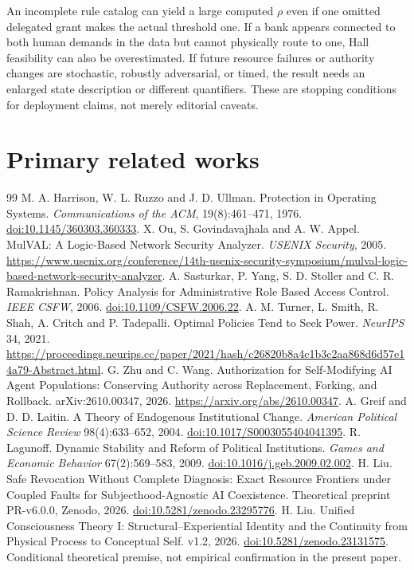 \documentclass[11pt,a4paper]{article}
\theoremstyle{definition}\newtheorem{definition}{Definition}
\begin{document}
An incomplete rule catalog can yield a large computed $\rho$ even if one omitted delegated grant makes the actual threshold one. If a bank appears connected to both human demands in the data but cannot physically route to one, Hall feasibility can also be overestimated. If future resource failures or authority changes are stochastic, robustly adversarial, or timed, the result needs an enlarged state description or different quantifiers. These are stopping conditions for deployment claims, not merely editorial caveats.

\section{Primary related works}
\begin{thebibliography}{99}\small
{} M. A. Harrison, W. L. Ruzzo and J. D. Ullman. Protection in Operating Systems. \emph{Communications of the ACM}, 19(8):461--471, 1976. \href{https://doi.org/10.1145/360303.360333}{doi:10.1145/360303.360333}.
 X. Ou, S. Govindavajhala and A. W. Appel. MulVAL: A Logic-Based Network Security Analyzer. \emph{USENIX Security}, 2005. \url{https://www.usenix.org/conference/14th-usenix-security-symposium/mulval-logic-based-network-security-analyzer}.
 A. Sasturkar, P. Yang, S. D. Stoller and C. R. Ramakrishnan. Policy Analysis for Administrative Role Based Access Control. \emph{IEEE CSFW}, 2006. \href{https://doi.org/10.1109/CSFW.2006.22}{doi:10.1109/CSFW.2006.22}.
 A. M. Turner, L. Smith, R. Shah, A. Critch and P. Tadepalli. Optimal Policies Tend to Seek Power. \emph{NeurIPS} 34, 2021. \url{https://proceedings.neurips.cc/paper/2021/hash/c26820b8a4c1b3c2aa868d6d57e14a79-Abstract.html}.
 G. Zhu and C. Wang. Authorization for Self-Modifying AI Agent Populations: Conserving Authority across Replacement, Forking, and Rollback. arXiv:2610.00347, 2026. \url{https://arxiv.org/abs/2610.00347}.
 A. Greif and D. D. Laitin. A Theory of Endogenous Institutional Change. \emph{American Political Science Review} 98(4):633--652, 2004. \href{https://doi.org/10.1017/S0003055404041395}{doi:10.1017/S0003055404041395}.
 R. Lagunoff. Dynamic Stability and Reform of Political Institutions. \emph{Games and Economic Behavior} 67(2):569--583, 2009. \href{https://doi.org/10.1016/j.geb.2009.02.002}{doi:10.1016/j.geb.2009.02.002}.
 H. Liu. Safe Revocation Without Complete Diagnosis: Exact Resource Frontiers under Coupled Faults for Subjecthood-Agnostic AI Coexistence. Theoretical preprint PR-v6.0.0, Zenodo, 2026. \href{https://doi.org/10.5281/zenodo.23295776}{doi:10.5281/zenodo.23295776}.
 H. Liu. Unified Consciousness Theory I: Structural--Experiential Identity and the Continuity from Physical Process to Conceptual Self. v1.2, 2026. \href{https://doi.org/10.5281/zenodo.23131575}{doi:10.5281/zenodo.23131575}. Conditional theoretical premise, not empirical confirmation in the present paper.
\end{thebibliography}
\end{document}
